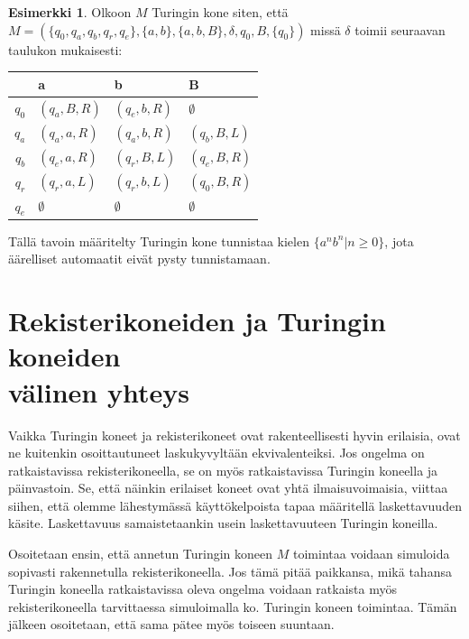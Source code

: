 \documentclass[a4paper, 12pt]{article}
\theoremstyle{definition}
\newtheorem{example}[mydef]{Esimerkki}
\theoremstyle{plain}
\begin{document}
\begin{example}
\label{ex:anbn}
Olkoon $M$ Turingin kone siten, että\\$M = (\{q_0, q_a, q_b, q_r, q_e\}, \{a, b\}, \{a, b, B\}, \delta, q_0, B, \{q_0\})$ missä $\delta$ toimii seuraavan taulukon mukaisesti:

\begin{tabular}{r | l l l}
& a & b & B \\
\hline
$q_0$ & $(q_a, B, R)$ & $(q_e, b, R)$ & $\emptyset$ \\
$q_a$ & $(q_a, a, R)$ & $(q_a, b, R)$ & $(q_b, B, L)$ \\
$q_b$ & $(q_e, a, R)$ & $(q_r, B, L)$ & $(q_e, B, R)$\\
$q_r$ & $(q_r, a, L)$ & $(q_r, b, L)$ & $(q_0, B, R)$\\
$q_e$ & $\emptyset$ & $\emptyset$ & $\emptyset$ \\ 
\end{tabular}

Tällä tavoin määritelty Turingin kone tunnistaa kielen $\{a^nb^n | n \geq 0\}$, jota äärelliset automaatit eivät pysty tunnistamaan.

\end{example}

\section{Rekisterikoneiden ja Turingin koneiden\\ välinen yhteys}

Vaikka Turingin koneet ja rekisterikoneet ovat rakenteellisesti hyvin erilaisia, ovat ne kuitenkin osoittautuneet laskukyvyltään ekvivalenteiksi. Jos ongelma on ratkaistavissa rekisterikoneella, se on myös ratkaistavissa Turingin koneella ja päinvastoin. Se, että näinkin erilaiset koneet ovat yhtä ilmaisuvoimaisia, viittaa siihen, että olemme lähestymässä käyttökelpoista tapaa määritellä laskettavuuden käsite. Laskettavuus samaistetaankin usein laskettavuuteen Turingin koneilla.

Osoitetaan ensin, että annetun Turingin koneen $M$ toimintaa voidaan simuloida sopivasti rakennetulla rekisterikoneella. Jos tämä pitää paikkansa, mikä tahansa Turingin koneella ratkaistavissa oleva ongelma voidaan ratkaista myös rekisterikoneella tarvittaessa simuloimalla ko. Turingin koneen toimintaa. Tämän jälkeen osoitetaan, että sama pätee myös toiseen suuntaan.
\end{document}
